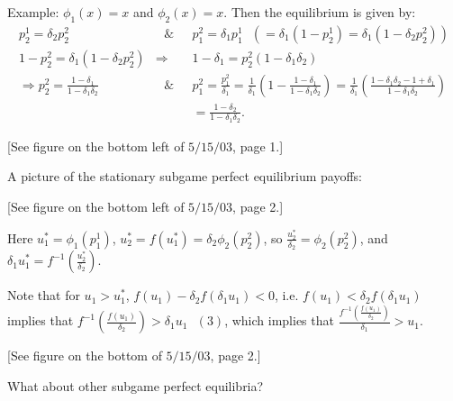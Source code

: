 \documentclass[12pt]{article}
\newcommand{\n}{\noindent}
\newcommand{\s}{\vspace{5mm}}
\begin{document}
\s
\n  Example:  $\phi_1(x)=x$ and $\phi_2(x)=x$.  Then the equilibrium is given by:
\begin{eqnarray*}
p_2^1=\delta_2p_2^2&\mbox{ }\&\mbox{ }&p_1^2=\delta_1p_1^1\mbox{ }(=\delta_1(1-p_2^1)=\delta_1(1-\delta_2p_2^2))\\
1-p_2^2=\delta_1(1-\delta_2p_2^2)&\Rightarrow&1-\delta_1=p_2^2(1-\delta_1\delta_2)\\
\Rightarrow p_2^2=\frac{1-\delta_1}{1-\delta_1\delta_2} &\mbox{ }\&\mbox{ }&p_1^2=\frac{p_1^2}{\delta_1}=\frac{1}{\delta_1}\left(1-\frac{1-\delta_1}{1-\delta_1\delta_2}\right)=\frac{1}{\delta_1}\left(\frac{1-\delta_1\delta_2-1+\delta_1}{1-\delta_1\delta_2}\right)\\
&&=\frac{1-\delta_2}{1-\delta_1\delta_2}.
\end{eqnarray*}

\s
\n
\begin{center}
[See figure on the bottom left of $5/15/03$, page 1.]
\end{center}

\s
\n A picture of the stationary subgame perfect equilibrium payoffs:
\begin{center}
[See figure on the bottom left of $5/15/03$, page 2.]
\end{center} Here $u_1^*=\phi_1(p_1^1)$, $u_2^*=f(u_1^*)=\delta_2\phi_2(p_2^2)$, so $\frac{u_2^*}{\delta_2}=\phi_2(p_2^2)$, and $\delta_1u_1^*=f^{-1}\left(\frac{u_2^*}{\delta_2}\right)$.

\s
\n Note that for $u_1>u_1^*$, $f(u_1)-\delta_2f(\delta_1u_1)<0$, i.e. $f(u_1)<\delta_2f(\delta_1u_1)$ implies that $f^{-1}\left(\frac{f(u_1)}{\delta_2}\right)>\delta_1u_1\mbox{ }(3)$, which implies that $\frac{f^{-1}\left(\frac{f(u_1)}{\delta_2}\right)}{\delta_1}>u_1$.

\begin{center}
[See figure on the bottom of $5/15/03$, page 2.]
\end{center}

\s
\n  What about other subgame perfect equilibria?  
\end{document}
